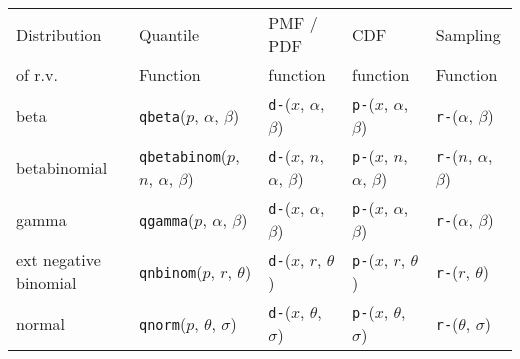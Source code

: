 \begin{table}[htp]
\centering
\small
\begin{tabular}{l | llll}
Distribution                  & Quantile  & PMF / PDF  &CDF       & Sampling  \\ 
of r.v. &  Function & function         & function &  Function \\ \hline
beta & \texttt{qbeta}($p$, $\alpha$, $\beta$)             
& \texttt{d-}($x$, $\alpha$, $\beta$)
& \texttt{p-}($x$, $\alpha$, $\beta$) 
& \texttt{r-}($\alpha$, $\beta$) \\
betabinomial & \texttt{qbetabinom}($p$, $n$, $\alpha$, $\beta$)              
& \texttt{d-}($x$, $n$, $\alpha$, $\beta$)
& \texttt{p-}($x$, $n$, $\alpha$, $\beta$) 
& \texttt{r-}($n$, $\alpha$, $\beta$) \\






gamma & \texttt{qgamma}($p$, $\alpha$, $\beta$) 
& \texttt{d-}($x$, $\alpha$, $\beta$)
& \texttt{p-}($x$, $\alpha$, $\beta$) 
& \texttt{r-}($\alpha$, $\beta$) \\




ext negative binomial & \texttt{qnbinom}($p$, $r$, $\theta$) 
& \texttt{d-}($x$, $r$, $\theta$) 
& \texttt{p-}($x$, $r$, $\theta$) 
& \texttt{r-}($r$, $\theta$) \\

normal & \texttt{qnorm}($p$, $\theta$, $\sigma$) 
& \texttt{d-}($x$, $\theta$, $\sigma$)
& \texttt{p-}($x$, $\theta$, $\sigma$) 
& \texttt{r-}($\theta$, $\sigma$) \\


\end{tabular}
\end{table}
